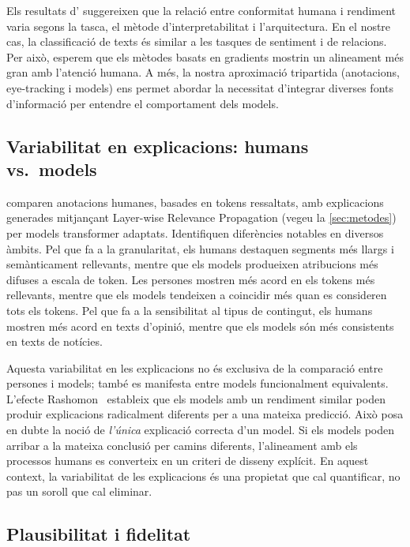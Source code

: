 Els resultats d'\textcite{ikhwantriLookingDeepEyes2023} suggereixen que la relació entre conformitat humana i rendiment varia segons la tasca, el mètode d'interpretabilitat i l'arquitectura.
En el nostre cas, la classificació de texts és similar a les tasques de sentiment i de relacions.
Per això, esperem que els mètodes basats en gradients mostrin un alineament més gran amb l'atenció humana.
A més, la nostra aproximació tripartida (anotacions, eye-tracking i models) ens permet abordar la necessitat d'integrar diverses fonts d'informació per entendre el comportament dels models.

\subsection{Variabilitat en explicacions: humans vs.\ models}

\textcite{bogaert_explanation_2026} comparen anotacions humanes, basades en tokens ressaltats, amb explicacions generades mitjançant Layer-wise Relevance Propagation (vegeu la \autoref{sec:metodes}) per models transformer adaptats.
Identifiquen diferències notables en diversos àmbits.
Pel que fa a la granularitat, els humans destaquen segments més llargs i semànticament rellevants, mentre que els models produeixen atribucions més difuses a escala de token.
Les persones mostren més acord en els tokens més rellevants, mentre que els models tendeixen a coincidir més quan es consideren tots els tokens.
Pel que fa a la sensibilitat al tipus de contingut, els humans mostren més acord en texts d'opinió, mentre que els models són més consistents en texts de notícies.

Aquesta variabilitat en les explicacions no és exclusiva de la comparació entre persones i models; també es manifesta entre models funcionalment equivalents.
L'efecte Rashomon~\cite{breiman2003statistical} estableix que els models amb un rendiment similar poden produir explicacions radicalment diferents per a una mateixa predicció. Això posa en dubte la noció de \textit{l'única} explicació correcta d'un model.
Si els models poden arribar a la mateixa conclusió per camins diferents, l'alineament amb els processos humans es converteix en un criteri de disseny explícit. En aquest context, la variabilitat de les explicacions és una propietat que cal quantificar, no pas un soroll que cal eliminar.

\subsection{Plausibilitat i fidelitat}

